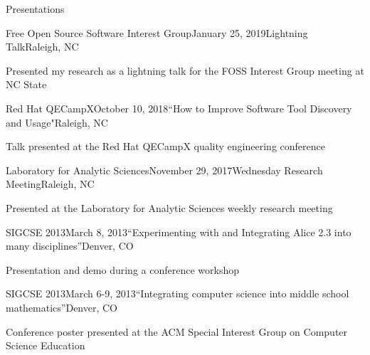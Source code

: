 \documentclass{resume} %
\begin{document}
\begin{rSection}{Presentations}

\begin{rSubsection}{Free Open Source Software Interest Group}{January 25, 2019}{Lightning Talk}{Raleigh, NC}
\item Presented my research as a lightning talk for the FOSS Interest Group meeting at NC State
\end{rSubsection}


\begin{rSubsection}{Red Hat QECampX}{October 10, 2018}{``How to Improve Software Tool Discovery and Usage"}{Raleigh, NC}
\item Talk presented at the Red Hat QECampX quality engineering conference
\end{rSubsection}


\begin{rSubsection}{Laboratory for Analytic Sciences}{November 29, 2017}{Wednesday Research Meeting}{Raleigh, NC}
\item Presented at the Laboratory for Analytic Sciences weekly research meeting
\end{rSubsection}


\begin{rSubsection}{SIGCSE 2013}{March 8, 2013}{``Experimenting with and Integrating Alice 2.3 into many disciplines''}{Denver, CO}
\item Presentation and demo during a conference workshop
\end{rSubsection}


\begin{rSubsection}{SIGCSE 2013}{March 6-9, 2013}{``Integrating computer science into middle school mathematics''}{Denver, CO}
\item Conference poster presented at the ACM Special Interest Group on Computer Science Education
\end{rSubsection}

\end{rSection}
\end{document}
